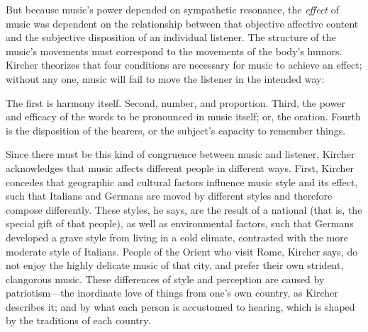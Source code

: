 But because music's power depended on sympathetic resonance, the \emph{effect}
of music was dependent on the relationship between that objective affective
content and the subjective disposition of an individual listener.
The structure of the music's movements must correspond to the movements of the
body's humors.
Kircher theorizes that four conditions are necessary for music to achieve an
effect; without any one, music will fail to move the listener in the intended
way:
\begin{quoting}
    The first is harmony itself. Second, number, and proportion. Third, the
    power and efficacy of the words to be pronounced in music itself; or, the
    oration.
    Fourth is the disposition of the hearers, or the subject's capacity to
    remember things.%
        \Autocite
        [550: .]
        {Kircher:Musurgia}
\end{quoting}
Since there must be this kind of congruence between music and listener, Kircher
acknowledges that music affects different people in different ways.
First, Kircher concedes that geographic and cultural factors influence music
style and its effect, such that Italians and Germans are moved by different
styles and therefore compose differently.
These styles, he says, are the result of a national  (that is,
the special gift of that people), as well as environmental factors, such that
Germans developed a grave style from living in a cold climate, contrasted with
the more moderate style of Italians.
People of the Orient who visit Rome, Kircher says, do not enjoy the highly
delicate music of that city, and prefer their own strident, clangorous music.
These differences of style and perception are caused by patriotism---the
inordinate love of things from one's own country, as Kircher describes it; and
by what each person is accustomed to hearing, which is shaped by the traditions
of each country.%
    \Autocites
    [543--544]{Kircher:Musurgia}
    [see partial translation in][707--711]{Strunk:SRMH}

